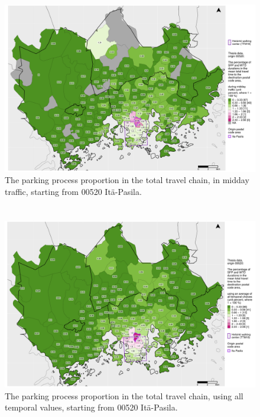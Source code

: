 \begin{figure}
    \section{}
    \centering
    \includegraphics[trim={0.9cm 0.3cm 0.25cm 0.3cm},clip,width=\textwidth]{images/compare_traveltimes_mapfill-msc_m_pct_fromzip-00520_11-10-2020.png}
    \caption[Parking process proportion from Itä-Pasila, midday traffic]{The parking process proportion in the total travel chain, in midday traffic, starting from 00520 Itä-Pasila.}%
    \label{fig:compare_msc_m_pct_00520}%
\end{figure}

\begin{figure}
    \section{}
    \centering
    \includegraphics[trim={0.9cm 0.3cm 0.25cm 0.3cm},clip,width=\textwidth]{images/compare_traveltimes_mapfill-msc_all_pct_fromzip-00520_11-10-2020.png}
    \caption[Parking process proportion from Itä-Pasila, all temporal values]{The parking process proportion in the total travel chain, using all temporal values, starting from 00520 Itä-Pasila.}%
    \label{fig:compare_msc_all_pct_00520}%
\end{figure}

